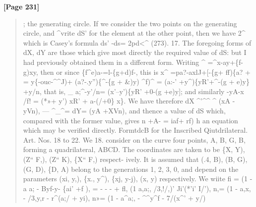 \documentclass[11pt,a4paper]{book}
\begin{document}
\textbf{[Page 231]}\\[0.2cm]
\begin{quote}
;
the generating circle. If we consider the two points on the generating circle, and
\textasciicircum{}vrite dS' for the element at the other point, then we have
2\textasciicircum{}
which is Casey's formula ds' -ds= 2pd<\textasciicircum{} (273).
17. The foregoing forms of dX, dY are those which give most directly the required
value of dS: but I had previously obtained them in a different form. Writing
\textasciicircum{} =\textasciicircum{}x-ay+\{f-g)xy,
then
or since
\{f\textasciicircum{}e)a-=l-\{g+d)f-,
this is
x\textasciicircum{} =pa?-axlJ+[-\{g+ ff)\{a? + = y\{-ouc-\textasciicircum{}\textasciicircum{}J)+ (a?-.y'')\{\textasciicircum{}-\{g + \&)y)
\textasciicircum{}f)\textasciicircum{}
= (a:-' +y\textasciicircum{})\{yR'+\textasciicircum{}-(g + e)y\} +y/n,
that is, \_
a;\textasciicircum{}-y'/n= (x'--y')\{yR' +0-(g +e)y];
and similarly
-yA-x /f! = (*»+ y') xR' + a-(/+0\} x\}.
We have therefore
dX \textasciicircum{}'\textasciicircum{}\textasciicircum{} \textasciicircum{} (xA - yVn),
---
\textasciicircum{}\_\textasciicircum{}=
dY= (yA +XVn),
and thence a value of dS which, compared with the former value, gives
n +A- = iaf+ rf) h
an equation which may be verified directly.
FormtdcB for the Inscribed Qiutdrilateral. Art. Nos. 18 to 22.
We
18. consider on the curve four points, A, B, G, B, forming a quadrilateral,
ABCD. The coordinates are taken to be \{X, Y), (Z`` F,), (Z`` K), \{X`` F,) respect-
ively. It is assumed that (.4, B), (B, G), (G, D), \{D, A) belong to the generations
1, 2, 3, 0, and depend on the parameters (xi, y,), \{x., y\textasciicircum{}), \{xj, y-j), (x, y) respectively.
We
wiite
fi = (1 - a a; - Byf-y- \{ai' +f ),
= - - - +
fl, (1 a,a;, /3,!/,)' Ji'(*'i' I/'),
n,= (1 - a,x, - /3,y,r - r\textasciicircum{}(a;/ + yi),
n»=
(1
-
a\textasciicircum{}a;,
-
\textasciicircum{}\textasciicircum{}y\textasciicircum{}f
-
7/(x\textasciicircum{}'
+
y/)
\end{quote}
\end{document}
